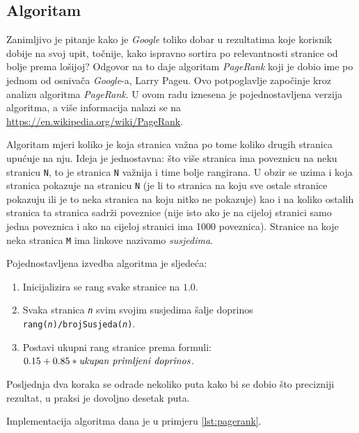 \documentclass[times, utf8, zavrsni]{fer}
\begin{document}
\subsection{Algoritam}
Zanimljivo je pitanje kako je \emph{Google} toliko dobar u rezultatima koje korisnik dobije na svoj upit, točnije, kako ispravno sortira po relevantnosti stranice od bolje prema lošijoj? Odgovor na to daje algoritam \emph{PageRank} koji je dobio ime po jednom od osnivača \emph{Google}-a, Larry Pageu. Ovo potpoglavlje započinje kroz analizu algoritma \emph{PageRank}. U ovom radu iznesena je pojednostavljena verzija algoritma, a više informacija nalazi se na \url{https://en.wikipedia.org/wiki/PageRank}. 

Algoritam mjeri koliko je koja stranica važna po tome koliko drugih stranica upućuje na nju. Ideja je jednostavna: što više stranica ima poveznicu na neku stranicu \texttt{N}, to je stranica \texttt{N} važnija i time bolje rangirana. U obzir se uzima i koja stranica pokazuje na stranicu \texttt{N} (je li to stranica na koju sve ostale stranice pokazuju ili je to neka stranica na koju nitko ne pokazuje) kao i na koliko ostalih stranica ta stranica sadrži poveznice (nije isto ako je na cijeloj stranici samo jedna poveznica i ako na cijeloj stranici ima 1000 poveznica). Stranice na koje neka stranica \texttt{M} ima linkove nazivamo \emph{susjedima}.

Pojednostavljena izvedba algoritma je sljedeća:
\begin{enumerate}
\item Inicijalizira se rang svake stranice na $1.0$.
\item Svaka stranica \texttt{\emph{n}} svim svojim susjedima šalje doprinos \texttt{rang(\emph{n})/brojSusjeda(\emph{n})}.
\item Postavi ukupni rang stranice prema formuli: $0.15 + 0.85*\emph{ukupan primljeni doprinos}$.
\end{enumerate}

Posljednja dva koraka se odrade nekoliko puta kako bi se dobio što precizniji rezultat, u praksi je dovoljno desetak puta.

Implementacija algoritma dana je u primjeru \ref{lst:pagerank}.
\end{document}
